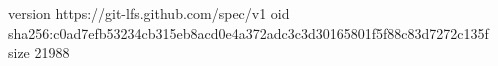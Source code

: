 version https://git-lfs.github.com/spec/v1
oid sha256:c0ad7efb53234cb315eb8acd0e4a372adc3c3d30165801f5f88c83d7272c135f
size 21988
